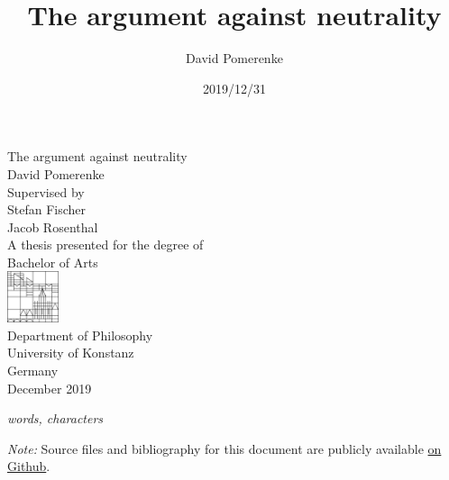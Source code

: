 \documentclass{report}
\title{The argument against neutrality}
\author{David Pomerenke}
\date{2019/12/31}
\begin{document}
\begin{titlepage}
    \begin{center}
        \vspace*{1cm}
        \huge
        The argument against neutrality\\
        \large
        David Pomerenke\\
        \vfill
        Supervised by\\
        Stefan Fischer\\
        Jacob Rosenthal\\
        \vfill
        A thesis presented for the degree of\\
        Bachelor of Arts\\
        \vfill
        \includegraphics[width=1.5cm]{0-logo.png}\\
        Department of Philosophy\\
        University of Konstanz\\
        Germany\\
        December 2019\\
    \end{center}
\end{titlepage}

\tableofcontents









\emph{
     words,
     characters
}
\cite{pomerenke_nach_2017}




\emph{Note:} Source files and bibliography for this document are publicly available \href{https://github.com/davidpomerenke/ba}{on Github}.
\end{document}

